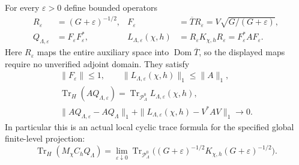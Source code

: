 For every $\varepsilon>0$ define bounded operators
\[
 \begin{aligned}
 R_\varepsilon&=(G+\varepsilon)^{-1/2},&
 F_\varepsilon&=\overline T R_\varepsilon
                 =V\sqrt{G/(G+\varepsilon)},\\
 Q_{\Lambda,\varepsilon}&=F_\varepsilon F_\varepsilon^*,&
 L_{\Lambda,\varepsilon}(\chi,h)
       &=R_\varepsilon K_{\chi,h}R_\varepsilon
         =F_\varepsilon^*AF_\varepsilon.
 \end{aligned}
 \tag{MA-GP.67}
\]
Here $R_\varepsilon$ maps the entire auxiliary space into
$\operatorname{Dom}\overline T$, so the displayed maps
require no unverified adjoint domain.  They satisfy
\[
 \begin{gathered}
 \|F_\varepsilon\|\le1,\qquad
 \|L_{\Lambda,\varepsilon}(\chi,h)\|_1\le\|A\|_1,\\
 \operatorname{Tr}_H(AQ_{\Lambda,\varepsilon})
       =\operatorname{Tr}_{\mathcal P_\Lambda^0}
                           L_{\Lambda,\varepsilon}(\chi,h),\\
 \|AQ_{\Lambda,\varepsilon}-AQ_\Lambda\|_1
  +\|L_{\Lambda,\varepsilon}(\chi,h)-V^*AV\|_1
                                  \longrightarrow0.
 \end{gathered}
 \tag{MA-GP.68}
\]
In particular this is an actual local cyclic trace formula
for the specified global finite-level projection:
\[
 \operatorname{Tr}_H(M_\chi C_hQ_\Lambda)
    =\lim_{\varepsilon\downarrow0}
       \operatorname{Tr}_{\mathcal P_\Lambda^0}
       \bigl((G+\varepsilon)^{-1/2}
                K_{\chi,h}(G+\varepsilon)^{-1/2}\bigr).
 \tag{MA-GP.69}
\]

